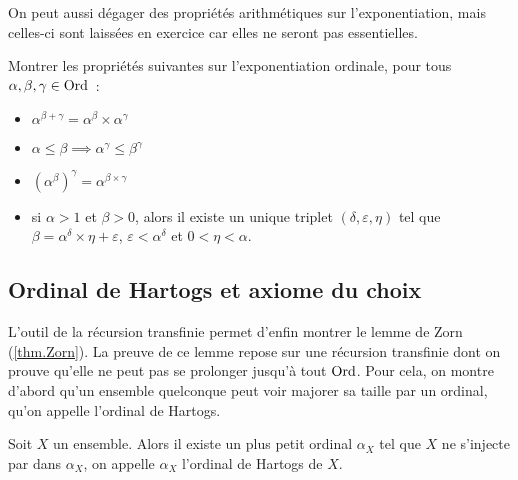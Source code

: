 On peut aussi dégager des propriétés arithmétiques sur l'exponentiation, mais
celles-ci sont laissées en exercice car elles ne seront pas essentielles.

\begin{exercise}
  Montrer les propriétés suivantes sur l'exponentiation ordinale, pour tous
  $\alpha,\beta,\gamma\in\operatorname{Ord}$~:
  \begin{itemize}
  \item $\alpha^{\beta+\gamma} = \alpha^\beta\times\alpha^\gamma$
  \item $\alpha \leq \beta \implies \alpha^\gamma\leq\beta^\gamma$
  \item $(\alpha^\beta)^\gamma = \alpha^{\beta\times\gamma}$
  \item si $\alpha > 1$ et $\beta >0$, alors il existe un unique triplet
    $(\delta,\varepsilon,\eta)$ tel que
    $\beta = \alpha^\delta\times\eta + \varepsilon$, $\varepsilon < \alpha^\delta$
    et $0 < \eta < \alpha$.
  \end{itemize}
\end{exercise}

\subsection{Ordinal de Hartogs et axiome du choix}

L'outil de la récursion transfinie permet d'enfin montrer le lemme de Zorn
(\cref{thm.Zorn}). La preuve de ce lemme repose sur une récursion transfinie
dont on prouve qu'elle ne peut pas se prolonger jusqu'à tout $\operatorname{Ord}$. Pour cela,
on montre d'abord qu'un ensemble quelconque peut voir majorer sa taille par un
ordinal, qu'on appelle l'ordinal de Hartogs.

\begin{definition}
  Soit $X$ un ensemble. Alors il existe un plus petit ordinal $\alpha_X$ tel
  que $X$ ne s'injecte par dans $\alpha_X$, on appelle $\alpha_X$ l'ordinal
  de Hartogs de $X$.
\end{definition}

